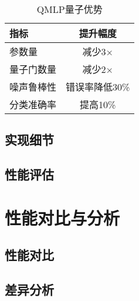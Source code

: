 \documentclass[10pt,a4paper,twoside]{article}
\numberwithin{figure}{section}%
\numberwithin{table}{section}%
\begin{document}
\begin{table}[H]
    \centering
    \caption{QMLP量子优势}
    \begin{tabular}{lc}
        \toprule
        指标 & 提升幅度 \\
        \midrule
        参数量 & 减少3$\times$ \\
        量子门数量 & 减少2$\times$ \\
        噪声鲁棒性 & 错误率降低30\% \\
        分类准确率 & 提高10\% \\
        \bottomrule
    \end{tabular}
\end{table}
\subsection{实现细节}

\subsection{性能评估}


\section{性能对比与分析}

\subsection{性能对比}

\subsection{差异分析}




\end{document}
